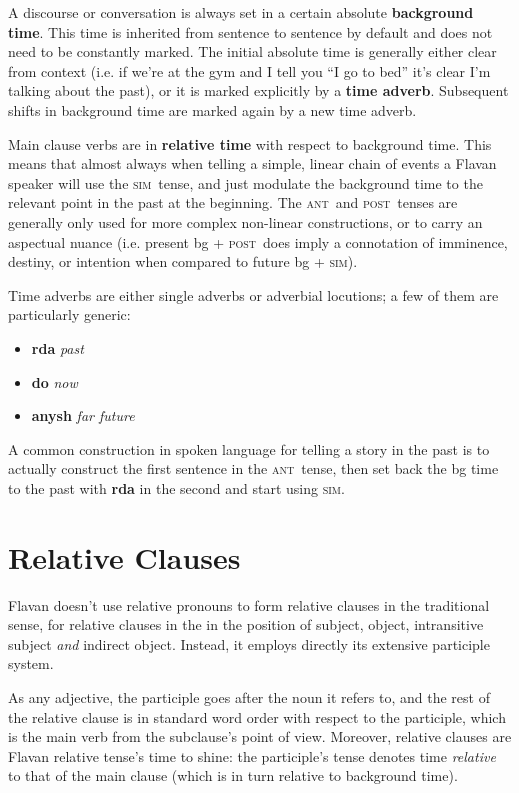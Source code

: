 \documentclass[10pt,oneside]{memoir}
\newcommand{\grammar}[1]{\textsc{#1}}
\newcommand{\POST}{\grammar{post}}
\newcommand{\SIM}{\grammar{sim}}
\newcommand{\ANT}{\grammar{ant}}
\begin{document}
A discourse or conversation is always set in a certain absolute \textbf{background time}. This time is inherited from sentence to sentence by default and does not need to be constantly marked. The initial absolute time is generally either clear from context (i.e. if we're at the gym and I tell you ``I go to bed'' it's clear I'm talking about the past), or it is marked explicitly by a \textbf{time adverb}. Subsequent shifts in background time are marked again by a new time adverb.

Main clause verbs are in \textbf{relative time} with respect to background time. This means that almost always when telling a simple, linear chain of events a Flavan speaker will use the \SIM\ tense, and just modulate the background time to the relevant point in the past at the beginning. The \ANT\ and \POST\ tenses are generally only used for more complex non-linear constructions, or to carry an aspectual nuance (i.e. present bg + \POST\ does imply a connotation of imminence, destiny, or intention when compared to future bg + \SIM).

Time adverbs are either single adverbs or adverbial locutions; a few of them are particularly generic:

\begin{itemize}
    \item \textbf{rda} \emph{past}\\
    \item \textbf{do} \emph{now}\\
    \item \textbf{anysh} \emph{far future}
\end{itemize}


A common construction in spoken language for telling a story in the past is to actually construct the first sentence in the \ANT\ tense, then set back the bg time to the past with \textbf{rda} in the second and start using \SIM.


\section{Relative Clauses}\label{relative}

Flavan doesn't use relative pronouns to form relative clauses in the traditional sense, for relative clauses in the in the position of subject, object, intransitive subject \emph{and} indirect object. Instead, it employs directly its extensive participle system.

As any adjective, the participle goes after the noun it refers to, and the rest of the relative clause is in standard word order with respect to the participle, which is the main verb from the subclause's point of view. Moreover, relative clauses are Flavan relative tense's time to shine: the participle's tense denotes time \emph{relative} to that of the main clause (which is in turn relative to background time).
\end{document}
